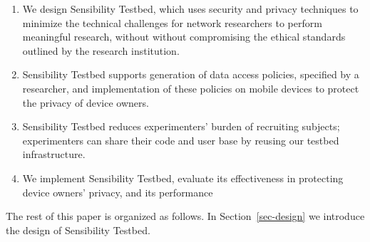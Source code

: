 \begin{enumerate}
\item We design Sensibility Testbed, which uses security and 
privacy techniques to minimize the technical challenges for 
network researchers to perform meaningful research, without 
without compromising the ethical standards outlined by the 
research institution.

\item Sensibility Testbed supports generation of data access 
policies, specified by a researcher, and implementation of 
these policies on mobile devices to protect the privacy of 
device owners.

\item Sensibility Testbed reduces experimenters' burden of 
recruiting subjects; experimenters can share their code and 
user base by reusing our testbed infrastructure.


\item We implement Sensibility Testbed, evaluate its effectiveness
in protecting device owners' privacy, and its performance 
\end{enumerate}

The rest of this paper is organized as follows. In Section~\ref{sec-design}
we introduce the design of Sensibility Testbed.
